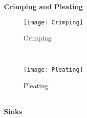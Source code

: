 \textbf{Crimping and Pleating}\\
\begin{figure}[h]
	\centering
	\texttt{[image: Crimping]}
	\caption{Crimping}
	\label{fig:crimping}
\end{figure}\\
\begin{figure}[h]
	\centering
	\texttt{[image: Pleating]}
	\caption{Pleating}
	\label{fig:pleating}
\end{figure}\\
\textbf{Sinks}\\












